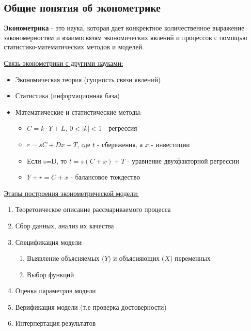 \documentclass[aps,%
12pt,%
final,%
oneside,
onecolumn,%
musixtex, %
superscriptaddress,%
centertags]{article} %
\begin{document}
\subsection{Общие понятия об эконометрике} 
\textbf{Эконометрика} - это наука, которая дает конкректное количественное выражение закономерностям и взаимосвязям экономических явлений и процессов с помощью статистико-математических методов и моделей.

\underline{Связь эконометрики с другими науками:}
\begin{itemize} 
  \item Экономическая теория (сущность связи явлений)
  \item Статистика (информационная база)
  \item Математические и статистические методы:
  \begin{itemize} 
  	\item $C=k\cdot Y+L$, $0<|k|<1$ - регрессия
  	\item $r=sC+Dx+T$, где $t$ - сбережения, а $x$ - инвестиции
  	\item Если s=D, то $t=s(C+x)+T$  - уравнение двухфакторной регрессии
  	\item $Y+r=C+x$ - балансовое тождество 
  \end{itemize} 
\end{itemize}

\underline{Этапы построения эконометрической модели:}
\begin{enumerate}
	
	\item Теоретоическое описание рассмариваемого процесса
	\item Сбор данных, анализ их качества
	\item Спецификация модели
	\begin{enumerate}
	\item Выявление объясняемых ($Y$) и объясняющих ($X$) переменных 
	\item Выбор функций
	\end{enumerate}
	\item Оценка параметров модели
	\item Верификация модели (т.е проверка достоверности)
	\item Интерпертация результатов 

\end{enumerate}
\end{document}
